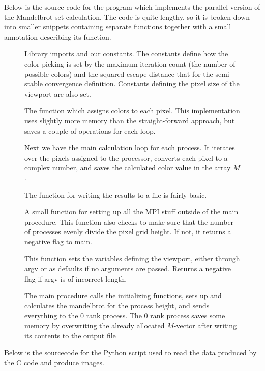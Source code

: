 \documentclass{article}
\newcounter{appx}
\newcommand{\codesnippet}[5]{
  \begin{figure}[!ht]
    
  #5
  \end{figure}
}
\newcommand{\mandelbrotsource}{../mandelbrot/mandelbrot.c}
\newcommand{\plotsource}{../mandelbrot/plot.py}
\begin{document}
\newpage
{}
Below is the source code for the program which implements the parallel version
of the Mandelbrot set calculation.
The code is quite lengthy, so it is broken down into smaller snippets containing separate functions
together with a small annotation describing its function.

\codesnippet{\mandelbrotsource}{C}{1}{8}{
Library imports and our constants.
The constants define how the color picking is set by the maximum iteration count
(the number of possible colors)
and the squared escape distance that for the semi-stable convergence definition.
Constants defining the pixel size of the viewport are also set.
}

\codesnippet{\mandelbrotsource}{C}{10}{27}{
The function which assigns colors to each pixel.
This implementation uses slightly more memory than the straight-forward approach,
but saves a couple of operations for each loop.
}

\codesnippet{\mandelbrotsource}{C}{29}{45}{
Next we have the main calculation loop for each process.
It iterates over the pixels assigned to the processor,
converts each pixel to a complex number,
and saves the calculated color value in the array $M$.
}

\codesnippet{\mandelbrotsource}{C}{47}{56}{
The function for writing the results to a file is fairly basic.
}

\codesnippet{\mandelbrotsource}{C}{58}{71}{
A small function for setting up all the MPI stuff outside of the main procedure.
This function also checks to make sure that the number of processes
evenly divide the pixel grid height.
If not, it returns a negative flag to main.
}

\codesnippet{\mandelbrotsource}{C}{73}{89}{
This function sets the variables defining the viewport,
either through argv or as defaults if no arguments are passed.
Returns a negative flag if argv is of incorrect length.
}

\codesnippet{\mandelbrotsource}{C}{91}{130}{
The main procedure calls the initializing functions,
sets up and calculates the mandelbrot for the process height,
and sends everything to the 0 rank process.
The 0 rank process saves some memory by overwriting the already allocated $M$-vector
after writing its contents to the output file
}

\FloatBarrier
\newpage
{}
Below is the sourcecode for the Python script
used to read the data produced by the C code and produce images.
\codesnippet{\plotsource}{Python}{1}{34}{}
\end{document}
